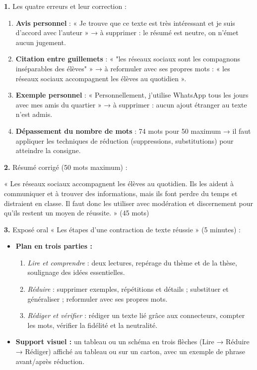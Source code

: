 \documentclass[11pt]{article}
\begin{document}
\begin{corrige}
\textbf{1.} Les quatre erreurs et leur correction :
\begin{enumerate}
\item \textbf{Avis personnel} : « Je trouve que ce texte est très intéressant et je suis d'accord avec l'auteur » → à supprimer : le résumé est neutre, on n'émet aucun jugement.
\item \textbf{Citation entre guillemets} : « "les réseaux sociaux sont les compagnons inséparables des élèves" » → à reformuler avec ses propres mots : « les réseaux sociaux accompagnent les élèves au quotidien ».
\item \textbf{Exemple personnel} : « Personnellement, j'utilise WhatsApp tous les jours avec mes amis du quartier » → à supprimer : aucun ajout étranger au texte n'est admis.
\item \textbf{Dépassement du nombre de mots} : 74 mots pour 50 maximum → il faut appliquer les techniques de réduction (suppressions, substitutions) pour atteindre la consigne.
\end{enumerate}

\textbf{2.} Résumé corrigé (50 mots maximum) :

« Les réseaux sociaux accompagnent les élèves au quotidien. Ils les aident à communiquer et à trouver des informations, mais ils font perdre du temps et distraient en classe. Il faut donc les utiliser avec modération et discernement pour qu'ils restent un moyen de réussite. » (45 mots)

\textbf{3.} Exposé oral « Les étapes d'une contraction de texte réussie » (5 minutes) :
\begin{itemize}
\item \textbf{Plan en trois parties :}
\begin{enumerate}
\item \emph{Lire et comprendre} : deux lectures, repérage du thème et de la thèse, soulignage des idées essentielles.
\item \emph{Réduire} : supprimer exemples, répétitions et détails ; substituer et généraliser ; reformuler avec ses propres mots.
\item \emph{Rédiger et vérifier} : rédiger un texte lié grâce aux connecteurs, compter les mots, vérifier la fidélité et la neutralité.
\end{enumerate}
\item \textbf{Support visuel :} un tableau ou un schéma en trois flèches (Lire → Réduire → Rédiger) affiché au tableau ou sur un carton, avec un exemple de phrase avant/après réduction.
\end{itemize}


\end{corrige}
\end{document}
